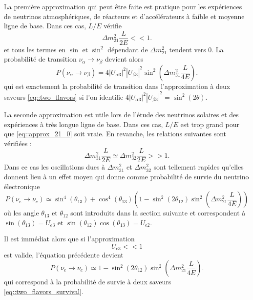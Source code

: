             La première approximation qui peut être faite est pratique pour les expériences de neutrinos atmosphériques, de réacteurs et d'accélérateurs à faible et moyenne ligne de base. Dans ces cas, $L/E$ vérifie
            \begin{equation}\label{eq::approx_21_0}
                \Delta m^2_{21}\frac{L}{2E} << 1.
            \end{equation}
            et tous les termes en $\sin$ et $\sin^2$ dépendant de $\Delta m^2_{21}$ tendent vers 0. La probabilité de transition $\nu_{\alpha}\to\nu_{\beta}$ devient alors
            \begin{equation}
                P(\nu_{\alpha}\to\nu_{\beta}) = 4|U_{\alpha 3}|^2|U_{\beta 3}|^2\sin^2\left(\Delta m^2_{31}\frac{L}{4E}\right).
            \end{equation}
            qui est exactement la probabilité de transition dans l'approximation à deux saveurs \eqref{eq::two_flavors} si l'on identifie $4|U_{\alpha 3}|^2|U_{\beta 3}|^2=\sin^2(2\theta)$.
            
            La seconde approximation est utile lors de l'étude des neutrinos solaires et des expériences à très longue ligne de base. Dans ces cas, $L/E$ est trop grand pour que \eqref{eq::approx_21_0} soit vraie. En revanche, les relations suivantes sont vérifiées : 
            \begin{equation}\label{eq::approx_31_eq_32}
                \Delta m^2_{31}\frac{L}{2E} \simeq \Delta m^2_{32}\frac{L}{2E}  >> 1.
            \end{equation}
            Dans ce cas les oscillations dues à $\Delta m^2_{31}$ et $\Delta m^2_{32}$ sont tellement rapides qu'elles donnent lieu à un effet moyen qui donne comme probabilité de survie du neutrino électronique
            \begin{equation}
                P(\nu_e\to\nu_e) \simeq \sin^4(\theta_{13}) + \cos^4(\theta_{13})\left(1-\sin^2(2\theta_{12})\sin^2\left(\Delta m^2_{21}\frac{L}{4E}\right)\right)
            \end{equation}
            où les angle $\theta_{13}$ et $\theta_{12}$ sont introduits dans la section suivante et correspondent à $\sin(\theta_{13})=U_{e3}$ et $\sin(\theta_{12})\cos(\theta_{13})=U_{e2}$.
            
            Il est immédiat alors que si l'approximation 
            \begin{equation}\label{eq::approx_13_eq_0}
                U_{e3} << 1
            \end{equation}
            est valide, l'équation précédente devient
            \begin{equation}\label{eq::solar_oscillation}
                P(\nu_e\to\nu_e) \simeq 1-\sin^2(2\theta_{12})\sin^2\left(\Delta m^2_{21}\frac{L}{4E}\right).
            \end{equation}
            qui correspond à la probabilité de survie à deux saveurs \eqref{eq::two_flavors_survival}.
            
